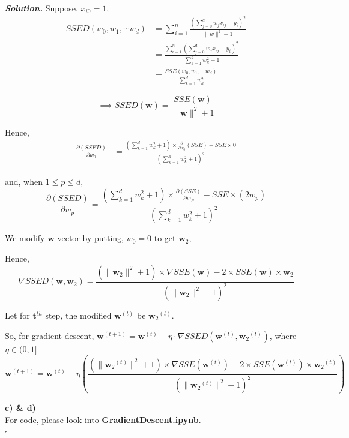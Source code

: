 \documentclass[8pt]{article}
\newenvironment{solution}[1][\it{Solution}]{\textbf{#1. } }{$\square$}
\begin{document}
\begin{solution}
Suppose, $\boxed{x_{i0}=1}$, \\
$$
\begin{aligned}
SSED(w_0, w_1, \cdots w_d) &=\sum_{i=1}^{n} \frac{\left(\sum_{j=0}^{d} w_{j} x_{i j}-y_{i}\right)^{2}}{\|w\|^{2}+1} \\
&=\frac{\sum_{i=1}^{n}\left(\sum_{j=0}^{d} w_{j} x_{i j}-y_{i}\right)^{2}}{\sum_{k=1}^{d} w_{k}^{2}+1} \\
&=\frac{S S E\left(w_{0}, w_{1}, \ldots w_{d}\right)}{\sum_{k=1}^{d} w_{k}^{2}}
\end{aligned}
$$

$$
\implies \boxed{SSED(\mathbf{w}) = \frac{SSE(\mathbf{w})}{\|\mathbf{w}\|^2+1}}
$$

Hence,
$$
\begin{aligned}
\frac{\partial(SSED)}{\partial w_{0}}&=\frac{\left(\sum_{k=1}^{d} w_{k}^{2}+1\right) \times \frac{\partial}{\partial w_{0}}(SSE) - SSE \times 0}{\left(\sum_{k=1}^{d} w_{k}^{2}+1\right)^{2}}
\end{aligned}
$$

and,  when $1 \le p \le d$,
$$
\frac{\partial(SSED)}{\partial w_{p}}=\frac{\left(\sum_{k=1}^{d} w_{k}^{2}+1\right) \times \frac{\partial(SSE)}{\partial w_{P}} - SSE \times \left(2 w_{p}\right)}{\left(\sum_{k=1}^{d} w_{k}^{2}+1\right)^{2}}
$$

We modify $\mathbf{w}$ vector by putting, $w_0 = 0$ to get $\mathbf{w}_2$,

Hence,
$$
\boxed{\nabla SSED (\mathbf{w}, \mathbf{w}_2) =\frac{\left(\|\mathbf{w}_2\|^{2} + 1\right) \times \nabla SSE(\mathbf{w}) - 2 \times SSE(\mathbf{w}) \times \mathbf{w}_2}{\left(\|\mathbf{w}_2\|^{2}+1\right)^2}}
$$

Let for $\mathbf{t}^{th}$ step, the modified $\mathbf{w}^{(t)}$ be ${\mathbf{w}_2}^{(t)}$.

So, for gradient descent,
$
\mathbf{w}^{(t+1)}=\mathbf{w}^{(t)}-\eta \cdot \nabla SSED\left({\mathbf{w}}^{(t)}, {\mathbf{w}_2}^{(t)}\right)
$, where $\eta \in(0, 1]$ \\

$$
\boxed{\mathbf{w}^{(t+1)}=\mathbf{w}^{(t)}-\eta \left(\frac{\left(\|{\mathbf{w}_2}^{(t)}\|^{2}+1\right) \times \nabla SSE({\mathbf{w}}^{(t)}) - 2 \times SSE({\mathbf{w}}^{(t)}) \times {\mathbf{w}_2}^{(t)}}{\left(\|{\mathbf{w}_2}^{(t)}\|^2+1\right)^{2}}\right)}
$$

\textbf{c) \& d)}\\

For code, please look into \textbf{GradientDescent.ipynb}.\\


\end{solution}
\end{document}

